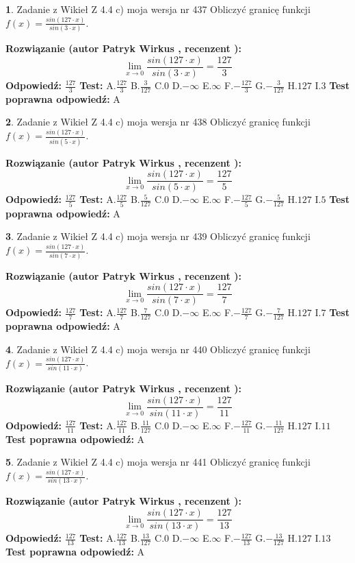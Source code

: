\documentclass[12pt, a4paper]{article}
\theoremstyle{definition} %
\newtheorem{zad}{}
\newcommand{\zadStart}[1]{\begin{zad}#1\newline}
\newcommand{\zadStop}{\end{zad}}
\newcommand{\rozwStart}[2]{\noindent \textbf{Rozwiązanie (autor #1 , recenzent #2): }\newline}
\newcommand{\rozwStop}{\newline}
\newcommand{\odpStart}{\noindent \textbf{Odpowiedź:}\newline}
\newcommand{\odpStop}{\newline}
\newcommand{\testStart}{\noindent \textbf{Test:}\newline}
\newcommand{\testStop}{\newline}
\newcommand{\kluczStart}{\noindent \textbf{Test poprawna odpowiedź:}\newline}
\newcommand{\kluczStop}{\newline}
\begin{document}
\zadStart{Zadanie z Wikieł Z 4.4 c) moja wersja nr 437}
Obliczyć granicę funkcji $f(x)=\frac{sin(127\cdot x)}{sin(3\cdot x)}$.
\zadStop
\rozwStart{Patryk Wirkus}{}
$$\lim\limits_{x\to 0}\frac{sin(127\cdot x)}{sin(3\cdot x)}=
\frac{127}{3}$$
\rozwStop
\odpStart
$\frac{127}{3}$
\odpStop
\testStart
A.$\frac{127}{3}$
B.$\frac{3}{127}$
C.$0$
D.$-\infty$
E.$\infty$
F.$-\frac{127}{3}$
G.$-\frac{3}{127}$
H.$127$
I.$3$
\testStop
\kluczStart
A
\kluczStop



\zadStart{Zadanie z Wikieł Z 4.4 c) moja wersja nr 438}
Obliczyć granicę funkcji $f(x)=\frac{sin(127\cdot x)}{sin(5\cdot x)}$.
\zadStop
\rozwStart{Patryk Wirkus}{}
$$\lim\limits_{x\to 0}\frac{sin(127\cdot x)}{sin(5\cdot x)}=
\frac{127}{5}$$
\rozwStop
\odpStart
$\frac{127}{5}$
\odpStop
\testStart
A.$\frac{127}{5}$
B.$\frac{5}{127}$
C.$0$
D.$-\infty$
E.$\infty$
F.$-\frac{127}{5}$
G.$-\frac{5}{127}$
H.$127$
I.$5$
\testStop
\kluczStart
A
\kluczStop



\zadStart{Zadanie z Wikieł Z 4.4 c) moja wersja nr 439}
Obliczyć granicę funkcji $f(x)=\frac{sin(127\cdot x)}{sin(7\cdot x)}$.
\zadStop
\rozwStart{Patryk Wirkus}{}
$$\lim\limits_{x\to 0}\frac{sin(127\cdot x)}{sin(7\cdot x)}=
\frac{127}{7}$$
\rozwStop
\odpStart
$\frac{127}{7}$
\odpStop
\testStart
A.$\frac{127}{7}$
B.$\frac{7}{127}$
C.$0$
D.$-\infty$
E.$\infty$
F.$-\frac{127}{7}$
G.$-\frac{7}{127}$
H.$127$
I.$7$
\testStop
\kluczStart
A
\kluczStop



\zadStart{Zadanie z Wikieł Z 4.4 c) moja wersja nr 440}
Obliczyć granicę funkcji $f(x)=\frac{sin(127\cdot x)}{sin(11\cdot x)}$.
\zadStop
\rozwStart{Patryk Wirkus}{}
$$\lim\limits_{x\to 0}\frac{sin(127\cdot x)}{sin(11\cdot x)}=
\frac{127}{11}$$
\rozwStop
\odpStart
$\frac{127}{11}$
\odpStop
\testStart
A.$\frac{127}{11}$
B.$\frac{11}{127}$
C.$0$
D.$-\infty$
E.$\infty$
F.$-\frac{127}{11}$
G.$-\frac{11}{127}$
H.$127$
I.$11$
\testStop
\kluczStart
A
\kluczStop



\zadStart{Zadanie z Wikieł Z 4.4 c) moja wersja nr 441}
Obliczyć granicę funkcji $f(x)=\frac{sin(127\cdot x)}{sin(13\cdot x)}$.
\zadStop
\rozwStart{Patryk Wirkus}{}
$$\lim\limits_{x\to 0}\frac{sin(127\cdot x)}{sin(13\cdot x)}=
\frac{127}{13}$$
\rozwStop
\odpStart
$\frac{127}{13}$
\odpStop
\testStart
A.$\frac{127}{13}$
B.$\frac{13}{127}$
C.$0$
D.$-\infty$
E.$\infty$
F.$-\frac{127}{13}$
G.$-\frac{13}{127}$
H.$127$
I.$13$
\testStop
\kluczStart
A
\kluczStop
\end{document}
